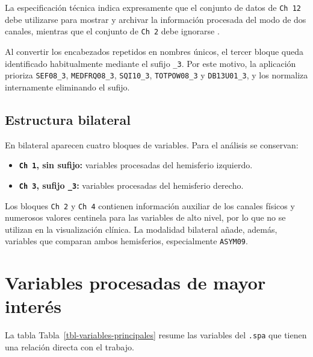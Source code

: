\documentclass[
  spanish,
  a4paper,
  12pt,
  twoside]{memoir}
\providecommand{\tightlist}{%
  \setlength{\itemsep}{0pt}\setlength{\parskip}{0pt}}
\begin{document}
La especificación técnica indica expresamente que el conjunto de datos
de \texttt{Ch\ 12} debe utilizarse para mostrar y archivar la
información procesada del modo de dos canales, mientras que el conjunto
de \texttt{Ch\ 2} debe ignorarse \citep{CovidienSerial2010}.

Al convertir los encabezados repetidos en nombres únicos, el tercer
bloque queda identificado habitualmente mediante el sufijo \texttt{\_3}.
Por este motivo, la aplicación prioriza \texttt{SEF08\_3},
\texttt{MEDFRQ08\_3}, \texttt{SQI10\_3}, \texttt{TOTPOW08\_3} y
\texttt{DB13U01\_3}, y los normaliza internamente eliminando el sufijo.

\section{Estructura bilateral}\label{estructura-bilateral}

En bilateral aparecen cuatro bloques de variables. Para el análisis se
conservan:

\begin{itemize}
\tightlist
\item
  \textbf{\texttt{Ch\ 1}, sin sufijo:} variables procesadas del
  hemisferio izquierdo.
\item
  \textbf{\texttt{Ch\ 3}, sufijo \texttt{\_3}:} variables procesadas del
  hemisferio derecho.
\end{itemize}

Los bloques \texttt{Ch\ 2} y \texttt{Ch\ 4} contienen información
auxiliar de los canales físicos y numerosos valores centinela para las
variables de alto nivel, por lo que no se utilizan en la visualización
clínica. La modalidad bilateral añade, además, variables que comparan
ambos hemisferios, especialmente \texttt{ASYM09}.

\chapter{Variables procesadas de mayor
interés}\label{variables-procesadas-de-mayor-interuxe9s}

La tabla Tabla~\ref{tbl-variables-principales} resume las variables del
\texttt{.spa} que tienen una relación directa con el trabajo.
\end{document}
